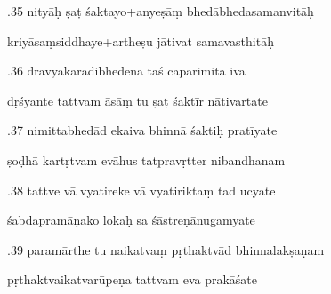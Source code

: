 \documentclass[article,12pt,a4paper]{memoir}%
\newcounter{parCount}
\begin{document}
	  
	  \pstart {}.35 nityāḥ ṣaṭ śaktayo+anyeṣāṃ   bhedābhedasamanvitāḥ 
	{}
	\pend%
      

	  
	  \pstart \leavevmode%
	kriyāsaṃsiddhaye+artheṣu jātivat samavasthitāḥ 
	{}
	\pend%
      

	  
	  \pstart {}.36 dravyākārādibhedena tāś cāparimitā iva 
	{}
	\pend%
      

	  
	  \pstart \leavevmode%
	dṛśyante tattvam āsāṃ tu ṣaṭ śaktīr nātivartate 
	{}
	\pend%
      

	  
	  \pstart {}.37 nimittabhedād ekaiva bhinnā śaktiḥ pratīyate 
	{}
	\pend%
      

	  
	  \pstart \leavevmode%
	ṣoḍhā kartṛtvam evāhus tatpravṛtter nibandhanam 
	{}
	\pend%
      

	  
	  \pstart {}.38 tattve vā vyatireke vā vyatiriktaṃ tad ucyate 
	{}
	\pend%
      

	  
	  \pstart \leavevmode%
	śabdapramāṇako lokaḥ sa śāstreṇānugamyate 
	{}
	\pend%
      

	  
	  \pstart {}.39 paramārthe tu naikatvaṃ pṛthaktvād bhinnalakṣaṇam 
	{}
	\pend%
      

	  
	  \pstart \leavevmode%
	pṛthaktvaikatvarūpeṇa tattvam eva prakāśate 
	{}
	\pend%
      
\end{document}
